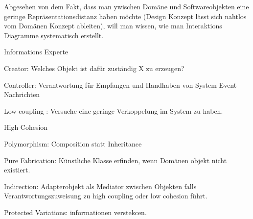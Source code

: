 Abgesehen von dem Fakt, dass man ywischen Domäne und Softwareobjekten eine geringe Repräsentationsdistanz
haben möchte (Design Konzept lässt sich nahtlos vom Domänen Konzept ableiten), will man wissen,
wie man Interaktions Diagramme systematisch erstellt.
\begin{compactenum}
    \item Informations Experte
    \item Creator: Welches Objekt ist dafür zuständig X zu erzeugen?
    \item Controller: Verantwortung für Empfangen und Handhaben von System Event Nachrichten
    \item Low coupling : Versuche eine geringe Verkoppelung im System zu haben.
    \item High Cohesion
    \item Polymorphism: Composition statt Inheritance
    \item Pure Fabrication: Künstliche Klasse erfinden, wenn Domänen objekt nicht existiert.
    \item Indirection: Adapterobjekt als Mediator zwischen Objekten falls Verantwortungszuweisung zu
    high coupling oder low cohesion führt.
    \item Protected Variations: informationen verstekcen.

\end{compactenum}
